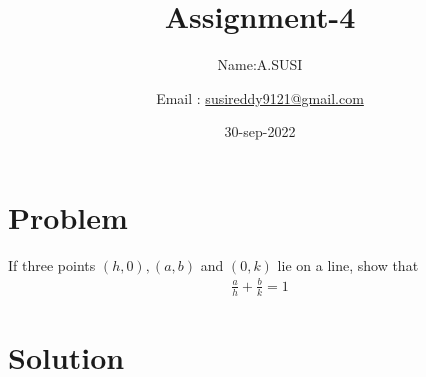 \documentclass[10pt, a4paper]{article}
\begin{document}
\title{Assignment-4}
\author{Name:A.SUSI\and Email :  \url{susireddy9121@gmail.com}}
\date{30-sep-2022}
\maketitle



\section{Problem}
\fi
If three points $(h, 0), (a, b)$ and $(0, k)$ lie on a line, 
show that 
\begin{align}
\frac{a}{h}+\frac{b}{k}=1
\end{align}
\solution 
\iffalse
\section{Solution}
\end{document}
